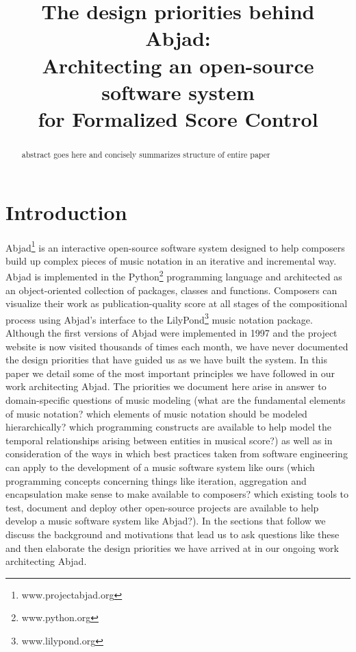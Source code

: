 \documentclass{article}
\title{The design priorities behind Abjad: \\
Architecting an open-source software system \\
for Formalized Score Control}
\begin{document}
\capstartfalse
\maketitle
\capstarttrue

\begin{abstract}
abstract goes here and concisely summarizes structure of entire paper
\end{abstract}

\section{Introduction} \label{sec:background}
Abjad\footnote{www.projectabjad.org} is an interactive open-source software
system designed to help composers build up complex pieces of music notation in
an iterative and incremental way.  Abjad is implemented in the
Python\footnote{www.python.org} programming language and architected as an
object-oriented collection of packages, classes and functions. Composers can
visualize their work as publication-quality score at all stages of the
compositional process using Abjad's interface to the
LilyPond\footnote{www.lilypond.org} music notation package. Although the first
versions of Abjad were implemented in 1997 and the project website is now
visited thousands of times each month, we have never documented the design
priorities that have guided us as we have built the system. In this paper we
detail some of the most important principles we have followed in our work
architecting Abjad. The priorities we document here arise in answer to
domain-specific questions of music modeling (what are the fundamental elements
of music notation? which elements of music notation should be modeled
hierarchically? which programming constructs are available to help model the
temporal relationships arising between entities in musical score?) as well as
in consideration of the ways in which best practices taken from software
engineering can apply to the development of a music software system like ours
(which programming concepts concerning things like iteration, aggregation and
encapsulation make sense to make available to composers? which existing tools
to test, document and deploy other open-source projects are available to help
develop a music software system like Abjad?). In the sections that follow we
discuss the background and motivations that lead us to ask questions like these
and then elaborate the design priorities we have arrived at in our ongoing work
architecting Abjad.
\end{document}

